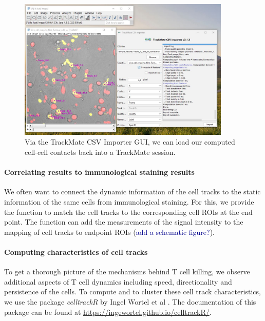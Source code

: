 \documentclass{report}
\begin{document}
\begin{figure}[h!]
\centering
\includegraphics[width=0.9\textwidth]{Screenshot_TrackMate_CSV_Importer.JPG}
\caption[TrackMate_CSV_Importer]{Via the TrackMate CSV Importer GUI, we can load our computed cell-cell contacts back into a TrackMate session. \label{TrackMate_CSV_Importer}}
\end{figure}

\paragraph{Correlating results to immunological staining results}
We often want to connect the dynamic information of the cell tracks to the static information of the same cells from immunological staining. For this, we provide the function  to match the cell tracks to the corresponding cell ROIs at the end point. The function  can add the measurements of the signal intensity to the mapping of cell tracks to endpoint ROIs (\textcolor{darkblue}{add a schematic figure?}).


\paragraph{Computing characteristics of cell tracks} To get a thorough picture of the mechanisms behind T cell killing, we observe additional aspects of T cell dynamics including speed, directionality and persistence of the cells. To compute and to cluster these cell track characteristics, we use the package \textit{celltrackR} by Ingel Wortel et al \citep{RN299}. The documentation of this package can be found at \url{https://ingewortel.github.io/celltrackR/}.
\end{document}
